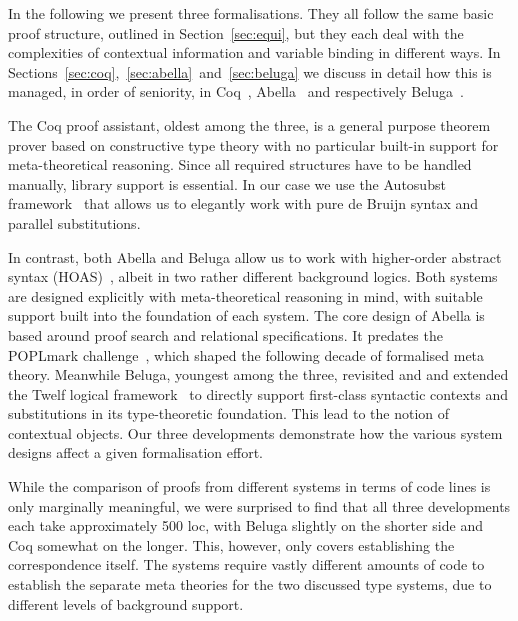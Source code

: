 \documentclass[a4paper,UKenglish]{lipics-v2016}
\theoremstyle{plain}
\begin{document}
In the following we present three formalisations.
They all follow the same basic proof structure, outlined in Section~\ref{sec:equi}, but they each deal with the complexities of contextual information and variable binding in different ways.
In Sections~\ref{sec:coq},~\ref{sec:abella}~and~\ref{sec:beluga} we discuss in detail how this is managed, in order of seniority, in Coq~\cite{CoqWebsite}, Abella~\cite{AbellaTutorial} and respectively Beluga~\cite{Pientka:CADE15}.

The Coq proof assistant, oldest among the three, is a general purpose theorem prover based on constructive type theory with no particular built-in support for meta-theoretical reasoning.
Since all required structures have to be handled manually, library support is essential.
In our case we use the Autosubst framework~\cite{DBLP:conf/itp/SchaferTS15} that allows us to elegantly work with pure de Bruijn syntax and parallel substitutions.

In contrast, both Abella and Beluga allow us to work with higher-order abstract syntax (HOAS)~\cite{DBLP:conf/pldi/PfenningE88}, albeit in two rather different background logics.
Both systems are designed explicitly with meta-theoretical reasoning in mind, with suitable support built into the foundation of each system.
The core design of Abella is based around proof search and relational specifications.
It predates the POPLmark challenge~\cite{poplmark}, which shaped the following decade of formalised meta theory.
Meanwhile Beluga, youngest among the three, revisited and and extended the Twelf logical framework~\cite{DBLP:conf/cade/PfenningS99} to directly support first-class syntactic contexts and substitutions in its type-theoretic foundation.
This lead to the notion of contextual objects.
Our three developments demonstrate how the various system designs affect a given formalisation effort.

While the comparison of proofs from different systems in terms of code lines is only marginally meaningful, we were surprised to find that all three developments each take approximately 500 loc, with Beluga slightly on the shorter side and Coq somewhat on the longer.
This, however, only covers establishing the correspondence itself.
The systems require vastly different amounts of code to establish the separate meta theories for the two discussed type systems, due to different levels of background support.
\end{document}

